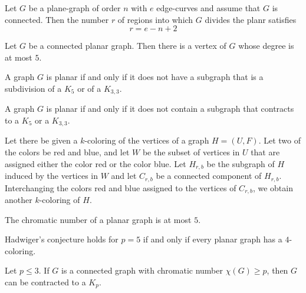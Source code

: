 \begin{theorem}
  \label{thm:12.2.1}
  Let $G$ be a plane-graph of order $n$ with $e$ edge-curves and assume that $G$ is connected. Then the number $r$ of regions into which $G$ divides the planr satisfies
  \begin{equation}\label{12.4}
    r=e-n+2
  \end{equation}
\end{theorem}

\begin{theorem}
  \label{thm:12.2.2}
  Let $G$ be a connected planar graph. Then there is a vertex of $G$ whose degree is at most $5$.
\end{theorem}

\begin{theorem}
  \label{thm:12.2.3}
  A graph $G$ is planar if and only if it does not have a subgraph that is a subdivision of a $K_5$
  or of a $K_{3,3}$.
\end{theorem}

\begin{theorem}
  \label{thm:12.2.4}
  A graph $G$ is planar if and only if it does not contain a subgraph that contracts to a $K_5$ or
  a $K_{3,3}$.
\end{theorem}

\begin{theorem}
  \label{thm:12.3.1}
  Let there be given a $k$-coloring of the vertices of a graph $H=(U, F)$. Let two of the colors be red and blue, and let $W$ be the subset of vertices in $U$ that are assigned either the color red or the color blue. Let $H_{r, b}$ be the subgraph of $H$ induced by the vertices in $W$ and let $C_{r, b}$ be a connected component of $H_{r, b}$. Interchanging the colors red and blue assigned to the vertices of $C_{r, b}$, we obtain another $k$-coloring of $H$.
\end{theorem}

\begin{theorem}
  \label{thm:12.3.2}
  The chromatic number of a planar graph is at most $5$.
\end{theorem}

\begin{theorem}
  \label{thm:12.3.3}
  Hadwiger's conjecture holds for $p = 5$ if and only if every planar graph has a $4$-coloring.
\end{theorem}

\begin{theorem}
  \label{thm:12.3.4}
  Let $p \leq 3$. If $G$ is a connected graph with chromatic number $\chi(G) \geq p$, then $G$ can be contracted to a $K_p$.
\end{theorem}

